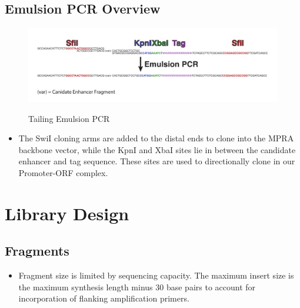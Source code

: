 \documentclass[a4paper]{article}
\begin{document}
	\subsection{Emulsion PCR Overview}
    	\begin{figure}[H]
			\centering
			\includegraphics[width=1.0\textwidth]{Sequence_Emulsion_PCR.pdf}
			\label{fig:Emulsion}
			\caption{Tailing Emulsion PCR}
        \end{figure}
        \begin{itemize}
                
            \item The SwiI cloning arms are added to the distal ends to clone into the MPRA backbone vector, while the KpnI and XbaI sites lie in between the candidate enhancer and tag sequence. These sites are used to directionally clone in our Promoter-ORF complex. 
                              
    	\end{itemize}

\section{Library Design}
	\subsection{Fragments} 
    	\begin{itemize}
                
            \item Fragment size is limited by sequencing capacity. The maximum insert size is the maximum synthesis length minus 30 base pairs to account for incorporation of flanking amplification primers. 
                              
    	\end{itemize}
	
\end{document}
